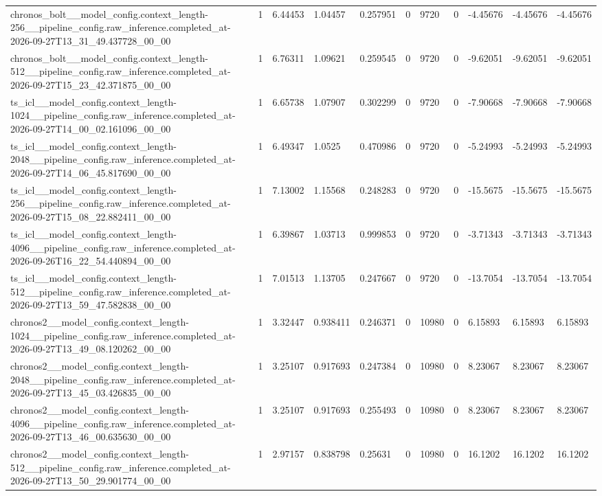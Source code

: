\begin{tabular}{lllllllllll}
chronos\_bolt\_\_model\_config.context\_length-256\_\_pipeline\_config.raw\_inference.completed\_at-2026-09-27T13\_31\_49.437728\_00\_00 & 1 & 6.44453 & 1.04457 & 0.257951 & 0 & 9720 & 0 & -4.45676 & -4.45676 & -4.45676 \\
chronos\_bolt\_\_model\_config.context\_length-512\_\_pipeline\_config.raw\_inference.completed\_at-2026-09-27T15\_23\_42.371875\_00\_00 & 1 & 6.76311 & 1.09621 & 0.259545 & 0 & 9720 & 0 & -9.62051 & -9.62051 & -9.62051 \\
ts\_icl\_\_model\_config.context\_length-1024\_\_pipeline\_config.raw\_inference.completed\_at-2026-09-27T14\_00\_02.161096\_00\_00 & 1 & 6.65738 & 1.07907 & 0.302299 & 0 & 9720 & 0 & -7.90668 & -7.90668 & -7.90668 \\
ts\_icl\_\_model\_config.context\_length-2048\_\_pipeline\_config.raw\_inference.completed\_at-2026-09-27T14\_06\_45.817690\_00\_00 & 1 & 6.49347 & 1.0525 & 0.470986 & 0 & 9720 & 0 & -5.24993 & -5.24993 & -5.24993 \\
ts\_icl\_\_model\_config.context\_length-256\_\_pipeline\_config.raw\_inference.completed\_at-2026-09-27T15\_08\_22.882411\_00\_00 & 1 & 7.13002 & 1.15568 & 0.248283 & 0 & 9720 & 0 & -15.5675 & -15.5675 & -15.5675 \\
ts\_icl\_\_model\_config.context\_length-4096\_\_pipeline\_config.raw\_inference.completed\_at-2026-09-26T16\_22\_54.440894\_00\_00 & 1 & 6.39867 & 1.03713 & 0.999853 & 0 & 9720 & 0 & -3.71343 & -3.71343 & -3.71343 \\
ts\_icl\_\_model\_config.context\_length-512\_\_pipeline\_config.raw\_inference.completed\_at-2026-09-27T13\_59\_47.582838\_00\_00 & 1 & 7.01513 & 1.13705 & 0.247667 & 0 & 9720 & 0 & -13.7054 & -13.7054 & -13.7054 \\
chronos2\_\_model\_config.context\_length-1024\_\_pipeline\_config.raw\_inference.completed\_at-2026-09-27T13\_49\_08.120262\_00\_00 & 1 & 3.32447 & 0.938411 & 0.246371 & 0 & 10980 & 0 & 6.15893 & 6.15893 & 6.15893 \\
chronos2\_\_model\_config.context\_length-2048\_\_pipeline\_config.raw\_inference.completed\_at-2026-09-27T13\_45\_03.426835\_00\_00 & 1 & 3.25107 & 0.917693 & 0.247384 & 0 & 10980 & 0 & 8.23067 & 8.23067 & 8.23067 \\
chronos2\_\_model\_config.context\_length-4096\_\_pipeline\_config.raw\_inference.completed\_at-2026-09-27T13\_46\_00.635630\_00\_00 & 1 & 3.25107 & 0.917693 & 0.255493 & 0 & 10980 & 0 & 8.23067 & 8.23067 & 8.23067 \\
chronos2\_\_model\_config.context\_length-512\_\_pipeline\_config.raw\_inference.completed\_at-2026-09-27T13\_50\_29.901774\_00\_00 & 1 & 2.97157 & 0.838798 & 0.25631 & 0 & 10980 & 0 & 16.1202 & 16.1202 & 16.1202 \\

\end{tabular}
